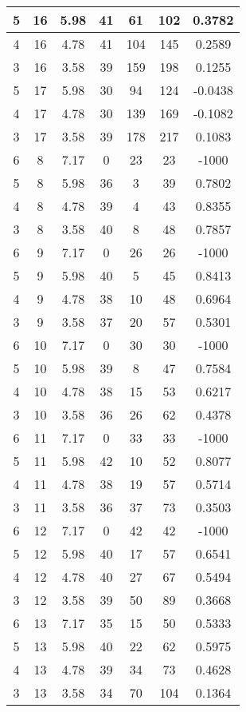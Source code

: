 \documentclass[letterpaper, 12pt]{article}
\begin{document}
\begin{longtable}{|c|c|c|c|c|c|c|}
\hline
5 & 16 & 5.98 & 41 & 61 & 102 & 0.3782 \\
\hline
4 & 16 & 4.78 & 41 & 104 & 145 & 0.2589 \\
\hline
3 & 16 & 3.58 & 39 & 159 & 198 & 0.1255 \\
\hline
5 & 17 & 5.98 & 30 & 94 & 124 & -0.0438 \\
\hline
4 & 17 & 4.78 & 30 & 139 & 169 & -0.1082 \\
\hline
3 & 17 & 3.58 & 39 & 178 & 217 & 0.1083 \\
\hline
6 & 8 & 7.17 & 0 & 23 & 23 & -1000 \\
\hline
5 & 8 & 5.98 & 36 & 3 & 39 & 0.7802 \\
\hline
4 & 8 & 4.78 & 39 & 4 & 43 & 0.8355 \\
\hline
3 & 8 & 3.58 & 40 & 8 & 48 & 0.7857 \\
\hline
6 & 9 & 7.17 & 0 & 26 & 26 & -1000 \\
\hline
5 & 9 & 5.98 & 40 & 5 & 45 & 0.8413 \\
\hline
4 & 9 & 4.78 & 38 & 10 & 48 & 0.6964 \\
\hline
3 & 9 & 3.58 & 37 & 20 & 57 & 0.5301 \\
\hline
6 & 10 & 7.17 & 0 & 30 & 30 & -1000 \\
\hline
5 & 10 & 5.98 & 39 & 8 & 47 & 0.7584 \\
\hline
4 & 10 & 4.78 & 38 & 15 & 53 & 0.6217 \\
\hline
3 & 10 & 3.58 & 36 & 26 & 62 & 0.4378 \\
\hline
6 & 11 & 7.17 & 0 & 33 & 33 & -1000 \\
\hline
5 & 11 & 5.98 & 42 & 10 & 52 & 0.8077 \\
\hline
4 & 11 & 4.78 & 38 & 19 & 57 & 0.5714 \\
\hline
3 & 11 & 3.58 & 36 & 37 & 73 & 0.3503 \\
\hline
6 & 12 & 7.17 & 0 & 42 & 42 & -1000 \\
\hline
5 & 12 & 5.98 & 40 & 17 & 57 & 0.6541 \\
\hline
4 & 12 & 4.78 & 40 & 27 & 67 & 0.5494 \\
\hline
3 & 12 & 3.58 & 39 & 50 & 89 & 0.3668 \\
\hline
6 & 13 & 7.17 & 35 & 15 & 50 & 0.5333 \\
\hline
5 & 13 & 5.98 & 40 & 22 & 62 & 0.5975 \\
\hline
4 & 13 & 4.78 & 39 & 34 & 73 & 0.4628 \\
\hline
3 & 13 & 3.58 & 34 & 70 & 104 & 0.1364 \\

\end{longtable}
\end{document}
